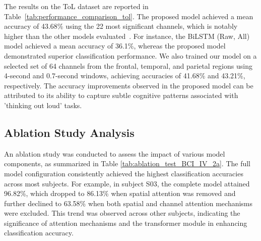 \documentclass[pdflatex,sn-mathphys-num]{sn-jnl}%
\theoremstyle{thmstyleone}%
\theoremstyle{thmstyletwo}%
\theoremstyle{thmstylethree}%
\begin{document}
The results on the ToL dataset are reported in Table~\ref{tab:performance_comparison_tol}. The proposed model achieved a mean accuracy of 43.68\% using the 22 most significant channels, which is notably higher than the other models evaluated~\cite{Gasparini2022InnerSpeech}. For instance, the BiLSTM (Raw, All) model achieved a mean accuracy of 36.1\%, whereas the proposed model demonstrated superior classification performance. We also trained our model on a selected set of 64 channels from the frontal, temporal, and parietal regions using 4-second and 0.7-second windows, achieving accuracies of 41.68\% and 43.21\%, respectively. The accuracy improvements observed in the proposed model can be attributed to its ability to capture subtle cognitive patterns associated with 'thinking out loud' tasks.

\subsection{Ablation Study Analysis}

An ablation study was conducted to assess the impact of various model components, as summarized in Table \ref{tab:ablation_test_BCI_IV_2a}. The full model configuration consistently achieved the highest classification accuracies across most subjects. For example, in subject S03, the complete model attained 96.82\%, which dropped to 86.13\% when spatial attention was removed and further declined to 63.58\% when both spatial and channel attention mechanisms were excluded. This trend was observed across other subjects, indicating the significance of attention mechanisms and the transformer module in enhancing classification accuracy.

\begin{table*}[htbp]
\centering
\caption{Ablation Test Results on BCI IV-2a Dataset. The classification accuracy (\%) for each subject is shown with various model configurations.}
\label{tab:ablation_test_BCI_IV_2a}
\end{table*}
\end{document}
